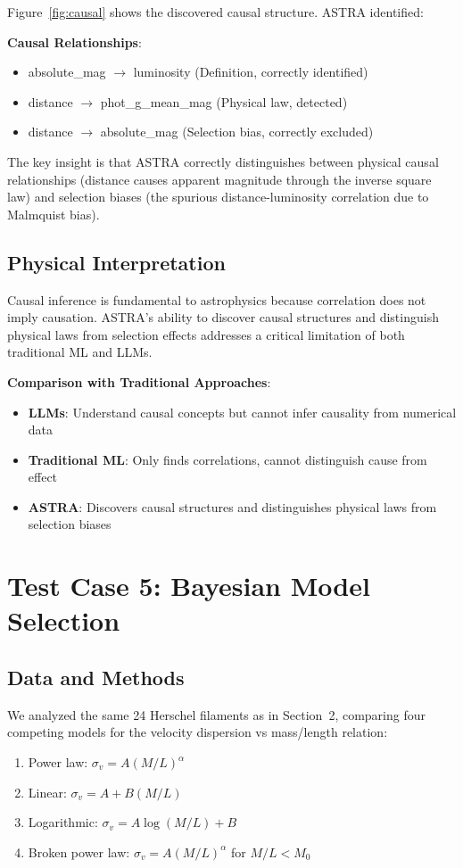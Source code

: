 \documentclass[usenatbib]{rasti}
\begin{document}
Figure~\ref{fig:causal} shows the discovered causal structure. ASTRA identified:

\textbf{Causal Relationships}:
\begin{itemize}
\item absolute\_mag $\to$ luminosity (Definition, correctly identified)
\item distance $\to$ phot\_g\_mean\_mag (Physical law, detected)
\item distance $\to$ absolute\_mag (Selection bias, correctly excluded)
\end{itemize}

The key insight is that ASTRA correctly distinguishes between physical causal relationships (distance causes apparent magnitude through the inverse square law) and selection biases (the spurious distance-luminosity correlation due to Malmquist bias).

\subsection{Physical Interpretation}

Causal inference is fundamental to astrophysics because correlation does not imply causation. ASTRA's ability to discover causal structures and distinguish physical laws from selection effects addresses a critical limitation of both traditional ML and LLMs.

\textbf{Comparison with Traditional Approaches}:
\begin{itemize}
\item \textbf{LLMs}: Understand causal concepts but cannot infer causality from numerical data
\item \textbf{Traditional ML}: Only finds correlations, cannot distinguish cause from effect
\item \textbf{ASTRA}: Discovers causal structures and distinguishes physical laws from selection biases
\end{itemize}

\section{Test Case 5: Bayesian Model Selection}

\subsection{Data and Methods}

We analyzed the same 24 Herschel filaments as in Section~2, comparing four competing models for the velocity dispersion vs mass/length relation:
\begin{enumerate}
\item Power law: $\sigma_v = A (M/L)^\alpha$
\item Linear: $\sigma_v = A + B (M/L)$
\item Logarithmic: $\sigma_v = A \log(M/L) + B$
\item Broken power law: $\sigma_v = A (M/L)^\alpha$ for $M/L < M_0$
\end{enumerate}
\end{document}
